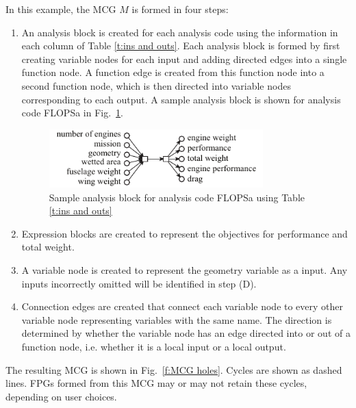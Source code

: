 	In this example, the MCG $M$ is formed in four steps:
	\begin{enumerate}
	\item An analysis block is created for each analysis code using the information in each column of Table \ref{t:ins and outs}. 
	Each analysis block is formed by first creating variable nodes for each input and adding directed edges into a single function node. 
A function edge is created from this function node into a second function node, which is then directed into variable nodes corresponding to each output. 
	A sample analysis block is shown for analysis code FLOPSa in Fig.~\ref{f:FLOPSb analysis block}.
	\begin{figure}[htb!]
	  \begin{center}
		\includegraphics[width=3.25in]{images/FLOPSa_analysis_block}
	  \end{center}
	  \caption{Sample analysis block for analysis code FLOPSa using Table \ref{t:ins and outs}}
	\label{f:FLOPSb analysis block}
	\end{figure}

	\item Expression blocks are created to represent the objectives for performance and total weight.

	\item A variable node is created to represent the geometry variable as a input. Any inputs incorrectly omitted will be identified in step (D).

	\item Connection edges are created that connect each variable node to every other variable node representing variables with the same name. 
	The direction is determined by whether the variable node has an edge directed into or out of a function node, i.e. whether it is a local input or a local output.
	\end{enumerate}
	The resulting MCG is shown in Fig.~\ref{f:MCG holes}. 
	Cycles are shown as dashed lines. FPGs formed from this MCG may or may not retain these cycles,  depending on user choices.

